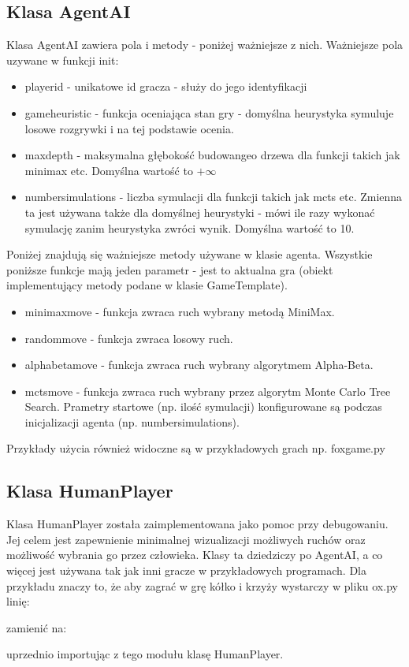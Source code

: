 \documentclass[polish,shortabstract,inz]{iithesis}
\begin{document}
\subsection{Klasa AgentAI}
Klasa AgentAI zawiera pola i metody - poniżej ważniejsze z nich.
Ważniejsze pola uzywane w funkcji init:
\begin{itemize}
  \item player\textunderscore id - unikatowe id gracza - służy do jego identyfikacji
  \item game\textunderscore heuristic - funkcja oceniająca stan gry - domyślna heurystyka symuluje losowe rozgrywki i na tej podstawie ocenia.
  \item max\textunderscore depth - maksymalna głębokość budowangeo drzewa dla funkcji takich jak minimax etc. Domyślna wartość to \( +\infty \)
  \item number\textunderscore simulations - liczba symulacji dla funkcji takich jak mcts etc. Zmienna ta jest używana także dla domyślnej heurystyki - mówi ile razy wykonać symulację zanim heurystyka zwróci wynik. Domyślna wartość to 10.
\end{itemize}

Poniżej znajdują się ważniejsze metody używane w klasie agenta.
Wszystkie poniższe funkcje mają jeden parametr - jest to aktualna gra (obiekt implementujący metody podane w klasie GameTemplate).
\begin{itemize}
  \item minimax\textunderscore move - funkcja zwraca ruch wybrany metodą MiniMax.
  \item random\textunderscore move - funkcja zwraca losowy ruch.
  \item alpha\textunderscore beta\textunderscore move - funkcja zwraca ruch wybrany algorytmem Alpha-Beta.
  \item mcts\textunderscore move - funkcja zwraca ruch wybrany przez algorytm Monte Carlo Tree Search.
  Prametry startowe (np. ilość symulacji) konfigurowane są podczas inicjalizacji agenta (np. number\textunderscore simulations).
\end{itemize}
Przykłady użycia również widoczne są w przykładowych grach np. fox\textunderscore game.py

\subsection{Klasa HumanPlayer}
Klasa HumanPlayer została zaimplementowana jako pomoc przy debugowaniu.
Jej celem jest zapewnienie minimalnej wizualizacji możliwych ruchów oraz możliwość wybrania go przez człowieka.
Klasy ta dziedziczy po AgentAI, a co więcej jest używana tak jak inni gracze w przykładowych programach.
Dla przykładu znaczy to, że aby zagrać w grę kółko i krzyży wystarczy w pliku ox.py linię:

zamienić na:

uprzednio importując z tego modułu klasę HumanPlayer.
\end{document}
